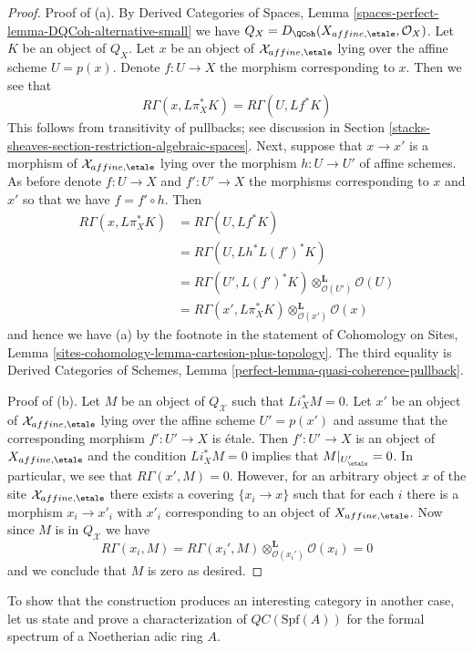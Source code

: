 \begin{proof}
\medskip\noindent
Proof of (a). By Derived Categories of Spaces, Lemma
\ref{spaces-perfect-lemma-DQCoh-alternative-small}
we have $Q_X = D_\QCoh(X_{affine, \etale}, \mathcal{O}_X)$.
Let $K$ be an object of $Q_X$. Let $x$ be an object of
$\mathcal{X}_{affine, \etale}$ lying over the affine
scheme $U = p(x)$. Denote $f : U \to X$ the morphism corresponding
to $x$. Then we see that
$$
R\Gamma(x, L\pi_X^*K) = R\Gamma(U, Lf^*K)
$$
This follows from transitivity of pullbacks; see discussion in
Section \ref{stacks-sheaves-section-restriction-algebraic-spaces}.
Next, suppose that $x \to x'$ is a morphism of $\mathcal{X}_{affine, \etale}$
lying over the morphism $h : U \to U'$ of affine schemes.
As before denote $f : U \to X$ and $f' : U' \to X$ the morphisms
corresponding to $x$ and $x'$ so that we have $f = f' \circ h$.
Then
\begin{align*}
R\Gamma(x, L\pi_X^*K)
& =
R\Gamma(U, Lf^*K) \\
& =
R\Gamma(U, Lh^*L(f')^*K) \\
& =
R\Gamma(U', L(f')^*K) \otimes_{\mathcal{O}(U')}^\mathbf{L} \mathcal{O}(U) \\
& =
R\Gamma(x', L\pi_X^*K) \otimes_{\mathcal{O}(x')}^\mathbf{L} \mathcal{O}(x)
\end{align*}
and hence we have (a) by the footnote in the statement of
Cohomology on Sites, Lemma
\ref{sites-cohomology-lemma-cartesion-plus-topology}. The third equality is
Derived Categories of Schemes, Lemma
\ref{perfect-lemma-quasi-coherence-pullback}.

\medskip\noindent
Proof of (b). Let $M$ be an object of $Q_\mathcal{X}$
such that $Li_X^*M = 0$. Let $x'$ be an object of $\mathcal{X}_{affine, \etale}$
lying over the affine scheme $U' = p(x')$ and assume that the corresponding
morphism $f' : U' \to X$ is \'etale. Then $f' : U' \to X$ is an object of
$X_{affine, \etale}$ and the condition $Li_X^*M = 0$ implies that
$M|_{U'_\etale} = 0$. In particular, we see that $R\Gamma(x', M) = 0$.
However, for an arbitrary object $x$ of the site
$\mathcal{X}_{affine, \etale}$ there exists a covering $\{x_i \to x\}$
such that for each $i$ there is a morphism $x_i \to x'_i$ with
$x'_i$ corresponding to an object of $X_{affine, \etale}$.
Now since $M$ is in $Q_\mathcal{X}$ we have
$$
R\Gamma(x_i, M) =
R\Gamma(x_i', M) \otimes_{\mathcal{O}(x_i')}^\mathbf{L} \mathcal{O}(x_i) =
0
$$
and we conclude that $M$ is zero as desired.
\end{proof}

To show that the construction produces an interesting category in another
case, let us state and prove a characterization of
$\mathit{QC}(\text{Spf}(A))$ for the formal spectrum of
a Noetherian adic ring $A$.

